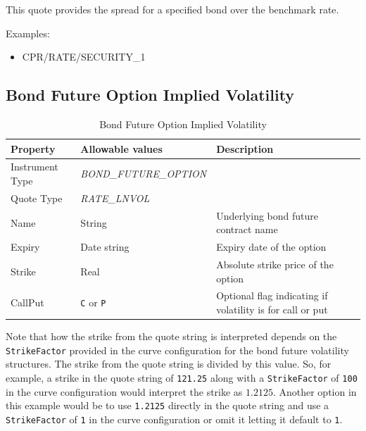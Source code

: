 This quote provides the spread for a specified bond over the benchmark rate.

\medskip
Examples:
\begin{itemize}
	\item CPR/RATE/SECURITY\_1
\end{itemize}

\subsection{Bond Future Option Implied Volatility}
\label{md:bond_future_option_iv}

\begin{table}[H]
    \centering
    \begin{tabular}{|p{3cm}|p{5.5cm}|p{5cm}|}
    \hline
    {\bf Property} & {\bf Allowable values} & {\bf Description} \\ \hline
    Instrument Type & \emph{BOND\_FUTURE\_OPTION} & \\ \hline
    Quote Type & \emph{RATE\_LNVOL} & \\ \hline
    Name & String & Underlying bond future contract name \\ \hline
    Expiry & Date string & Expiry date of the option \\ \hline
    Strike & Real & Absolute strike price of the option \\ \hline
    CallPut & \lstinline!C! or \lstinline!P! & Optional flag indicating if volatility is for call or put \\ \hline
    \end{tabular}
    \caption{Bond Future Option Implied Volatility}
    \label{tab:bond_future_option_iv_quote}
\end{table}

Note that how the strike from the quote string is interpreted depends on the \lstinline!StrikeFactor! 
provided in the curve configuration for the bond future volatility structures. The strike from the 
quote string is divided by this value. So, for example, a strike in the quote string of 
\lstinline!121.25! along with a \lstinline!StrikeFactor! of \lstinline!100! in the curve configuration 
would interpret the strike as $1.2125$. Another option in this example would be to use \lstinline!1.2125! 
directly in the quote string and use a \lstinline!StrikeFactor! of \lstinline!1! in the curve configuration 
or omit it letting it default to \lstinline!1!.

